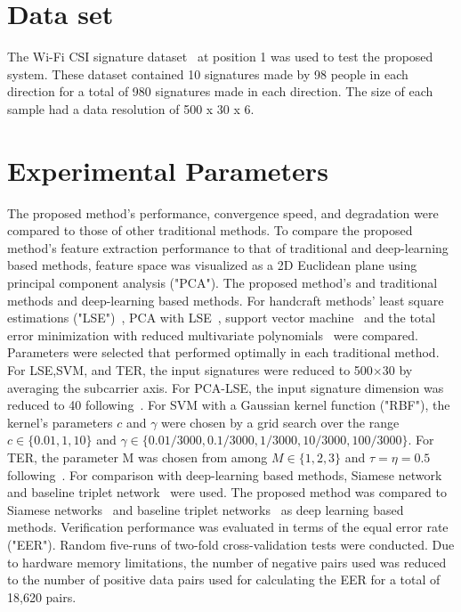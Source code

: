 \label{chp:Experiments}
\section{Data set}
\label{sec:Dataset}
The Wi-Fi CSI signature dataset~\cite{moon2017air} at position 1 was used to test the proposed system. These dataset contained 10 signatures made by 98 people in each direction for a total of 980 signatures made in each direction. The size of each sample had a data resolution of 500 x 30 x 6. 

\section{Experimental Parameters}
The proposed method's performance, convergence speed, and degradation were compared to those of other traditional methods.
To compare the proposed method's feature extraction performance to that of traditional and deep-learning based methods, feature space was visualized as a 2D Euclidean plane using principal component analysis ("PCA"). 
The proposed method's and traditional methods and deep-learning based methods.
For handcraft methods' least square estimations ("LSE")~\cite{duda2012pattern}, PCA with LSE~\cite{turk1991eigenfaces}, support vector machine~\cite{vapnik2013nature} and the total error minimization with reduced multivariate polynomials~\cite{toh2003fingerprint,toh2008between} were compared. Parameters were selected that performed optimally in each traditional method. For LSE,SVM, and TER, the input signatures were reduced to 500$\times$30 by averaging the subcarrier axis. For PCA-LSE, the input signature dimension was reduced to 40 following~\cite{moon2017air}. For SVM with a Gaussian kernel function ("RBF"), the kernel's parameters $c$ and $\gamma$ were chosen by a grid search over the range $c\in\{0.01,1,10\}$ and $\gamma\in\{0.01/3000, 0.1/3000, 1/3000, 10/3000, 100/3000\}$. For TER, the parameter M was chosen from among $M\in\{1,2,3\}$ and $\tau=\eta=0.5$ following~\cite{toh2008between}.
For comparison with deep-learning based methods, Siamese network~\cite{koch2015siamese} and baseline triplet network~\cite{hoffer2015deep} were used.
The proposed method was compared to Siamese networks~\cite{koch2015siamese} and baseline triplet networks~\cite{hoffer2015deep} as deep learning based methods.
Verification performance was evaluated in terms of the equal error rate ("EER"). Random five-runs of two-fold cross-validation tests were conducted.
Due to hardware memory limitations, the number of negative pairs used was reduced to the number of positive data pairs used for calculating the EER for a total of 18,620 pairs.

